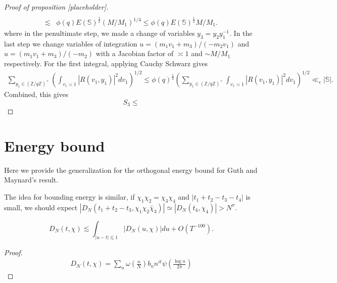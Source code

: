 \begin{proof}[{Proof of proposition [placeholder]}]
\begin{align*}
       \\ \lesssim&
       \phi(q)E(\mathbb{S})^{\frac{1}{2}}(M/M_1)^{1/4}\leq\phi(q)E(\mathbb{S})^{\frac{1}{2}}M/M_1.
       \end{align*}
       where in the penultimate step, we made a change of variables $y_3=y_2y_1^{-1}$. In the last step we change variables of integration $u=(m_1v_1+m_3)/(-m_2v_1)$ and $u=(m_1v_1+m_3)/(-m_2)$ with a Jacobian factor of $\asymp 1$ and $\sim M/M_1$ respectively. 
       For the first integral, applying Cauchy Schwarz gives \begin{align*}
        \sum_{y_1\in (\mathbb{Z}/q\mathbb{Z})^\times} \left(\int_{v_1\asymp 1} 
        \left|R\left(v_1,y_1\right)\right|^2dv_1\right)^{1/2} 
        \leq  \phi(q)^{\frac{1}{2}}\left(\sum_{y_1\in (\mathbb{Z}/q\mathbb{Z})^\times} \int_{v_1\asymp 1} 
        \left|R\left(v_1,y_1\right)\right|^2dv_1\right)^{1/2} 
        \ll_{\epsilon} |\mathbb{S}|.
       \end{align*}
       Combined, this gives \[
       S_3 \leq 
       \]
\end{proof}

\section{Energy bound}
Here we provide the generalization for the orthogonal energy bound for Guth and Maynard's result. 

The idea for bounding energy is similar, if $\chi_1\chi_2=\chi_3\chi_4$ and $|t_1+t_2-t_3-t_4|$ is small, we should expect $|D_N(t_1+t_2-t_3,\chi_1\chi_2\bar{\chi}_3)|\simeq |D_N(t_4,\chi_4)|>N^\sigma$.
\begin{lemma}
    \[
    D_N(t,\chi)\lesssim \int_{|u-t|\lesssim 1} |D_N(u,\chi)|du + O(T^{-100}).
    \]
\end{lemma}
\begin{proof}
    \begin{align*}
        D_N(t,\chi)=\sum_n \omega\left(\frac{n}{N}\right) b_n n^{it} \psi\left(\frac{\log n}{2\pi}\right)
    \end{align*}
\end{proof}